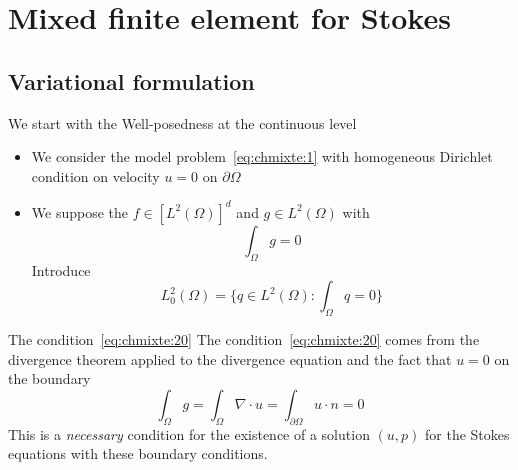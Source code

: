 \section{Mixed finite element for Stokes}
\label{sec:mixed-finite-element}

\subsection{Variational formulation }
\label{sec:vari-form-}

We start with the Well-posedness at the continuous level
  \begin{itemize}
  \item   We consider the model problem~\eqref{eq:chmixte:1} with homogeneous Dirichlet
  condition on velocity $u = 0$ on $\partial \Omega$
  \item   We suppose the $f \in [L^2(\Omega)]^d$ and $g \in L^2(\Omega)$ with
  \begin{equation}
    \label{eq:chmixte:20}
    \int_\Omega g = 0
  \end{equation}
    Introduce
  \begin{equation}
    \label{eq:chmixte:19}
    L^2_0(\Omega) = \Big\{ q \in L^2(\Omega): \int_\Omega q = 0 \Big\}
  \end{equation}

  \end{itemize}

  \begin{remark}{The condition~\eqref{eq:chmixte:20}}
    The condition~\eqref{eq:chmixte:20} comes from the divergence theorem applied to the
    divergence equation and the fact that $u=0$ on the boundary
    \begin{equation}
      \label{eq:chmixte:21}
      \int_\Omega g = \int_\Omega \nabla \cdot u = \int_{\partial \Omega} u
      \cdot n = 0
    \end{equation}
    This is a \emph{necessary} condition for the existence of a solution $(u,p)$
    for the Stokes equations with these boundary conditions.
  \end{remark}



